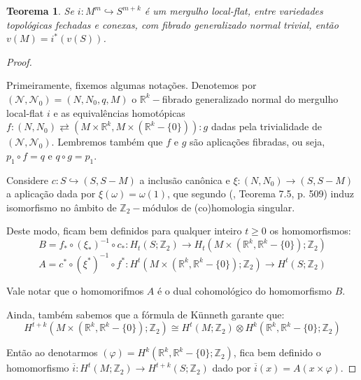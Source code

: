\documentclass[12pt,oneside]{book} %
\newtheorem{teo}    {\hspace{0.5cm}Teorema}[chapter]
\newcommand{\R}{\mathbb{R}}
\newcommand{\Z}{\mathbb{Z}}
\newcommand{\tensor}{\otimes}
\begin{document}
\begin{teo}\label{ap_wu_8}
	Se $i:M^{m}\hookrightarrow S^{m+k}$ é um mergulho local-flat, entre variedades topológicas fechadas e conexas, com fibrado generalizado normal trivial, então $v(M)=i^{*}(v(S))$.
\end{teo}

\begin{proof}
	
	\
	
	\par Primeiramente, fixemos algumas notações. Denotemos por $(\mathcal{N},\mathcal{N}_{0})=(N,N_{0},q,M)$ o $\R^{k}-$fibrado generalizado normal do mergulho local-flat $i$ e as equivalências homotópicas $f:(N,N_{0})\rightleftarrows (M\times\R^{k},M\times (\R^{k}-\{0\})):g$ dadas pela trivialidade de $(\mathcal{N},\mathcal{N}_{0})$. Lembremos também que $f$ e $g$ são aplicações fibradas, ou seja, $p_{1}\circ f=q$ e $q\circ g=p_{1}$.
	
	\par Considere $c:S\hookrightarrow (S,S-M)$ a inclusão canônica e $\xi:(N,N_{0})\to (S,S-M)$ a aplicação dada por $\xi(\omega)=\omega(1)$, que segundo (\cite{fadell_1}, Teorema 7.5, p. 509) induz isomorfismo no âmbito de $\Z_{2}-$módulos de (co)homologia singular.
	
	\par Deste modo, ficam bem definidos para qualquer inteiro $t\geq 0$ os homomorfismos:
	$$ B=f_{*}\circ (\xi_{*})^{-1}\circ c_{*}:H_{t}(S;\Z_{2})\to H_{t}(M\times (\R^{k},\R^{k}-\{0\});\Z_{2}) $$
	$$ A=c^{*}\circ (\xi^{*})^{-1}\circ f^{*}:H^{t}(M\times (\R^{k},\R^{k}-\{0\});\Z_{2})\to H^{t}(S;\Z_{2}) $$
	
	\par Vale notar que o homomorifmos $A$ é o dual cohomológico do homomorfismo $B$.
	
	\par Ainda, também sabemos que a fórmula de Künneth garante que:
	$$ H^{t+k}(M\times (\R^{k},\R^{k}-\{0\});\Z_{2})\cong H^{t}(M;\Z_{2})\tensor H^{k}(\R^{k},\R^{k}-\{0\};\Z_{2}) $$
	
	\par Então ao denotarmos $(\varphi)=H^{k}(\R^{k},\R^{k}-\{0\};\Z_{2})$, fica bem definido o homomorfismo $\overline{i}:H^{t}(M;\Z_{2})\to H^{t+k}(S;\Z_{2})$ dado por $\overline{i}(x)=A(x\times \varphi)$.
	

\end{proof}
\end{document}
